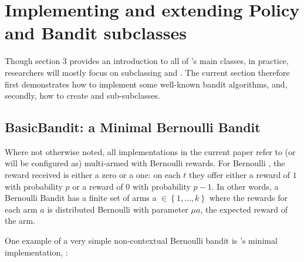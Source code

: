 \documentclass{jss}\usepackage[]{graphicx}\usepackage[]{color}
\begin{document}
\section{Implementing and extending Policy and Bandit subclasses}

Though section 3 provides an introduction to all of 's main classes, in practice, researchers will mostly focus on subclassing  and . The current section therefore first demonstrates how to implement some well-known bandit algorithms, and, secondly, how to create  and  sub-subclasses.

\subsection{BasicBandit: a Minimal Bernoulli Bandit}

Where not otherwise noted, all  implementations in the current paper refer to (or will be configured as) multi-armed  with Bernoulli rewards. For Bernoulli , the reward received is either a zero or a one: on each $t$ they offer either a reward of $1$ with probability $p$ or a reward of $0$ with probability $p - 1$. In other words, a Bernoulli Bandit has a finite set of arms a \(  \in \left\{ 1, \dots, k \right\} \) where the rewards for each arm $a$ is distributed Bernoulli with parameter ${\mu}a$, the expected reward of the arm.

One example of a very simple non-contextual Bernoulli bandit is 's minimal  implementation, :
\end{document}
